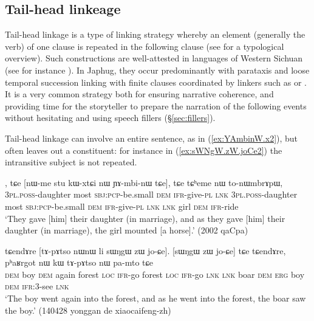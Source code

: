 \subsection{Tail-head linkeage} \label{sec:tail.head.linkeage}
Tail-head linkage is a type of linking strategy whereby an element (generally the verb) of one clause  is repeated in the following clause (see \citealt{vries05tailhead} for a typological overview). Such constructions are well-attested in languages of Western Sichuan (see for instance \citealt[688--693]{zhangsh13ersu}). In Japhug, they occur predominantly with parataxis and loose temporal succession linking with finite clauses coordinated by linkers such as  or . It is a very common strategy both for ensuring narrative coherence, and providing time for the storyteller to prepare the narration of the following events without hesitating and using speech fillers (§\ref{sec:fillers}). 

Tail-head linkage can involve an entire sentence, as  in (\ref{ex:YAmbinW.x2}), but often leaves out a constituent: for instance in (\ref{ex:sWNgW.zW.joCe2}) the intransitive subject  is not repeated.

\begin{exe}
\ex \label{ex:YAmbinW.x2}
, tɕe [nɯ-me stu kɯ-xtɕi nɯ ɲɤ-mbi-nɯ tɕe], tɕe tɕʰeme nɯ to-nɯmbrɤpɯ, \\
\textsc{3pl}.\textsc{poss}-daughter most \textsc{sbj}:\textsc{pcp}-be.small \textsc{dem} \textsc{ifr}-give-\textsc{pl}  \textsc{lnk} \textsc{3pl}.\textsc{poss}-daughter most \textsc{sbj}:\textsc{pcp}-be.small \textsc{dem} \textsc{ifr}-give-\textsc{pl}  \textsc{lnk}  \textsc{lnk} girl \textsc{dem} \textsc{ifr}-ride \\
\glt `They gave [him] their daughter (in marriage), and as they gave [him] their daughter (in marriage),  the girl mounted [a horse].' (2002 qaCpa)
\end{exe}


\begin{exe}
\ex \label{ex:sWNgW.zW.joCe2}
\gll tɕendɤre [tɤ-pɤtso nɯnɯ li sɯŋgɯ zɯ jo-ɕe]. [sɯŋgɯ zɯ jo-ɕe] tɕe tɕendɤre, pʰaʁrgot nɯ kɯ tɤ-pɤtso nɯ pa-mto tɕe \\
  \textsc{dem} boy \textsc{dem} again forest \textsc{loc} \textsc{ifr}-go  forest \textsc{loc} \textsc{ifr}-go \textsc{lnk} \textsc{lnk} boar \textsc{dem} \textsc{erg} boy \textsc{dem} \textsc{ifr}:3\flobv{}-see \textsc{lnk}   \\
\glt `The boy went again into the forest, and as he went into the forest, the boar saw the boy.' (140428 yonggan de xiaocaifeng-zh)
\end{exe}

